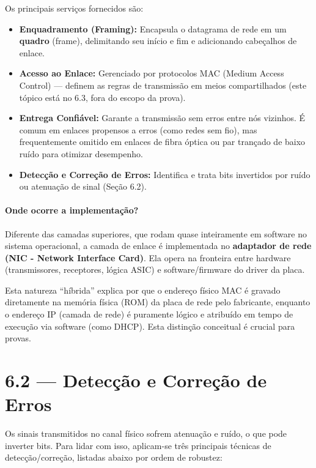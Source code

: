 \documentclass[11pt,a4paper]{article}
\begin{document}
Os principais serviços fornecidos são:
\begin{itemize}
    \item \textbf{Enquadramento (Framing):} Encapsula o datagrama de rede em um \textbf{quadro} (frame), delimitando seu início e fim e adicionando cabeçalhos de enlace.
    \item \textbf{Acesso ao Enlace:} Gerenciado por protocolos MAC (Medium Access Control) --- definem as regras de transmissão em meios compartilhados (este tópico está no 6.3, fora do escopo da prova).
    \item \textbf{Entrega Confiável:} Garante a transmissão sem erros entre nós vizinhos. É comum em enlaces propensos a erros (como redes sem fio), mas frequentemente omitido em enlaces de fibra óptica ou par trançado de baixo ruído para otimizar desempenho.
    \item \textbf{Detecção e Correção de Erros:} Identifica e trata bits invertidos por ruído ou atenuação de sinal (Seção 6.2).
\end{itemize}

\paragraph{Onde ocorre a implementação?}
Diferente das camadas superiores, que rodam quase inteiramente em software no sistema operacional, a camada de enlace é implementada no \textbf{adaptador de rede (NIC - Network Interface Card)}. Ela opera na fronteira entre hardware (transmissores, receptores, lógica ASIC) e software/firmware do driver da placa.

\begin{pratico}
Esta natureza ``híbrida'' explica por que o endereço físico MAC é gravado diretamente na memória física (ROM) da placa de rede pelo fabricante, enquanto o endereço IP (camada de rede) é puramente lógico e atribuído em tempo de execução via software (como DHCP). Esta distinção conceitual é crucial para provas.
\end{pratico}

\hrulefill

\section{6.2 --- Detecção e Correção de Erros}

Os sinais transmitidos no canal físico sofrem atenuação e ruído, o que pode inverter bits. Para lidar com isso, aplicam-se três principais técnicas de detecção/correção, listadas abaixo por ordem de robustez:
\end{document}

